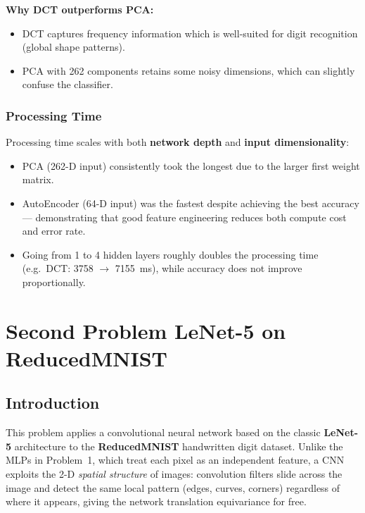 \documentclass[12pt, a4paper]{article}
\begin{document}
\textbf{Why DCT outperforms PCA:}
\begin{itemize}
    \item DCT captures frequency information which is well-suited for digit recognition (global
          shape patterns).
    \item PCA with 262 components retains some noisy dimensions, which can slightly confuse the
          classifier.
\end{itemize}

\subsubsection{Processing Time}

Processing time scales with both \textbf{network depth} and \textbf{input dimensionality}:
\begin{itemize}
    \item PCA (262-D input) consistently took the longest due to the larger first weight matrix.
    \item AutoEncoder (64-D input) was the fastest despite achieving the best accuracy ---
          demonstrating that good feature engineering reduces both compute cost and error rate.
    \item Going from 1 to 4 hidden layers roughly doubles the processing time
          (e.g.\ DCT: 3758 $\to$ 7155~ms), while accuracy does not improve proportionally.
\end{itemize}

\newpage
\section{Second Problem LeNet-5 on ReducedMNIST}

\subsection{Introduction}

This problem applies a convolutional neural network based on the classic \textbf{LeNet-5}
architecture to the \textbf{ReducedMNIST} handwritten digit dataset. Unlike the MLPs in
Problem~1, which treat each pixel as an independent feature, a CNN exploits the 2-D
\emph{spatial structure} of images: convolution filters slide across the image and detect the
same local pattern (edges, curves, corners) regardless of where it appears, giving the network
translation equivariance for free.
\end{document}
